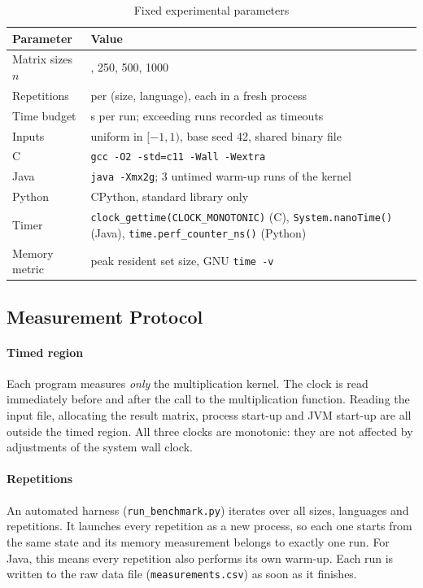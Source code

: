 \documentclass[conference,a4paper]{IEEEtran}
\newcommand{\code}[1]{\texttt{#1}}
\begin{document}
\begin{table}[t]
  \centering
  \caption{Fixed experimental parameters}
  \label{tab:parameters}
  \footnotesize
  \begin{tabular}{@{}l>{\raggedright\arraybackslash}p{}@{}}
    \toprule
    \textbf{Parameter} & \textbf{Value} \\
    \midrule
    Matrix sizes $n$       & 100, 250, 500, 1000 \\
    Repetitions            & 5 per (size, language), each in a fresh process \\
    Time budget            & 300 s per run; exceeding runs recorded as timeouts \\
    Inputs                 & uniform in $[-1,1)$, base seed 42, shared binary file \\
    C                      & \code{gcc -O2 -std=c11 -Wall -Wextra} \\
    Java                   & \code{java -Xmx2g}; 3 untimed warm-up runs of the kernel \\
    Python                 & CPython, standard library only \\
    Timer                  & \code{clock\_gettime(CLOCK\_MONOTONIC)} (C),
                             \code{System.nanoTime()} (Java),
                             \code{time.perf\_counter\_ns()} (Python) \\
    Memory metric          & peak resident set size, GNU \code{time -v} \\
    \bottomrule
  \end{tabular}
\end{table}

\subsection{Measurement Protocol}
\paragraph{Timed region} Each program measures \emph{only} the multiplication
kernel. The clock is read immediately before and after the call to the
multiplication function. Reading the input file, allocating the result matrix,
process start-up and JVM start-up are all outside the timed region. All three
clocks are monotonic: they are not affected by adjustments of the system
wall clock.

\paragraph{Repetitions} An automated harness (\code{run\_benchmark.py})
iterates over all sizes, languages and repetitions. It launches every
repetition as a new process, so each one starts from the same state and its
memory measurement belongs to exactly one run. For Java, this means every
repetition also performs its own warm-up. Each run is written to the raw data
file (\code{measurements.csv}) as soon as it finishes.
\end{document}
